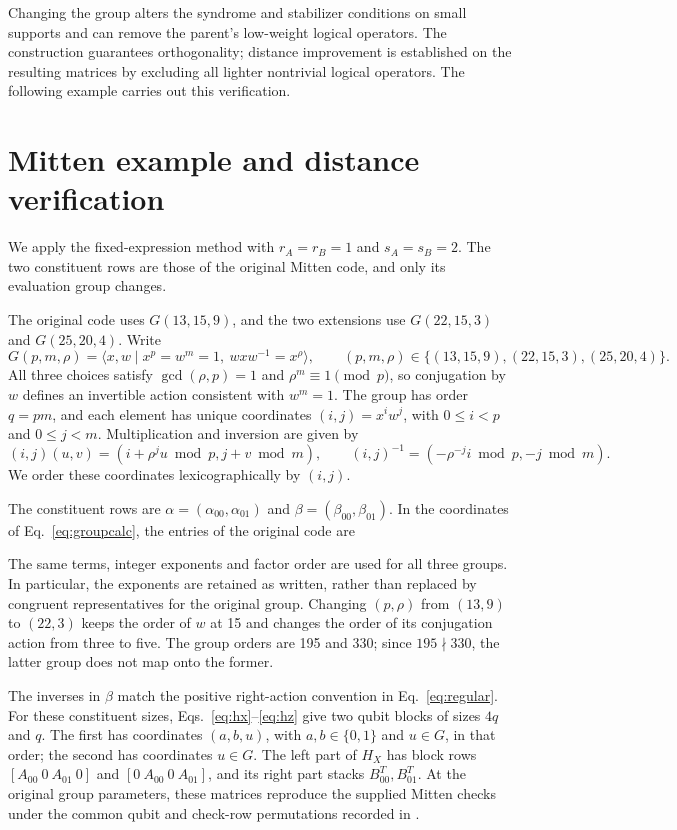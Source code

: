 \documentclass[12pt]{article}
\begin{document}
Changing the group alters the syndrome and stabilizer conditions on small
supports and can remove the parent's low-weight logical operators.
The construction guarantees orthogonality; distance improvement is
established on the resulting matrices by excluding all lighter nontrivial
logical operators. The following example carries out this verification.

\section{Mitten example and distance verification}\label{sec:results}
We apply the fixed-expression method with $r_A=r_B=1$ and $s_A=s_B=2$.
The two constituent rows are those of the original Mitten code, and only
its evaluation group changes.

The original code uses $G(13,15,9)$, and the two extensions use
$G(22,15,3)$ and $G(25,20,4)$. Write
\begin{equation}
 G(p,m,\rho)=\langle x,w\mid x^p=w^m=1,\ wxw^{-1}=x^\rho\rangle,
 \qquad (p,m,\rho)\in\{(13,15,9),(22,15,3),(25,20,4)\}.\label{eq:group}
\end{equation}
All three choices satisfy $\gcd(\rho,p)=1$ and $\rho^m\equiv1\pmod p$,
so conjugation by $w$ defines an invertible action consistent with
$w^m=1$. The group has order $q=pm$, and each element has unique
coordinates $(i,j)=x^iw^j$, with $0\leq i<p$ and $0\leq j<m$.
Multiplication and inversion are given by
\begin{equation}
 (i,j)(u,v)=(i+\rho^ju\bmod p,j+v\bmod m),\qquad
 (i,j)^{-1}=(-\rho^{-j}i\bmod p,-j\bmod m).
 \label{eq:groupcalc}
\end{equation}
We order these coordinates lexicographically by $(i,j)$.

The constituent rows are $\alpha=(\alpha_{00},\alpha_{01})$ and
$\beta=(\beta_{00},\beta_{01})$. In the coordinates of
Eq.~\eqref{eq:groupcalc}, the entries of the original code
\cite[Appendix K, Table XIII]{mitten} are

The same terms, integer exponents and factor order are used for all three
groups. In particular, the exponents are retained as written, rather than
replaced by congruent representatives for the original group.
Changing $(p,\rho)$ from $(13,9)$ to $(22,3)$ keeps the order of $w$ at
15 and changes the order of its conjugation action from three to five.
The group orders are 195 and 330; since $195\nmid330$, the latter group
does not map onto the former.

The inverses in $\beta$ match the positive right-action convention in
Eq.~\eqref{eq:regular}. For these constituent sizes,
Eqs.~\eqref{eq:hx}--\eqref{eq:hz} give two qubit blocks of sizes $4q$ and
$q$. The first has coordinates $(a,b,u)$, with $a,b\in\{0,1\}$ and
$u\in G$, in that order; the second has coordinates $u\in G$.
The left part of $H_X$ has block rows $[A_{00}\ 0\ A_{01}\ 0]$ and
$[0\ A_{00}\ 0\ A_{01}]$, and its right part stacks $B_{00}^T,B_{01}^T$.
At the original group parameters, these matrices reproduce the supplied
Mitten checks under the common qubit and check-row permutations recorded
in \cite{certificates}.
\end{document}
